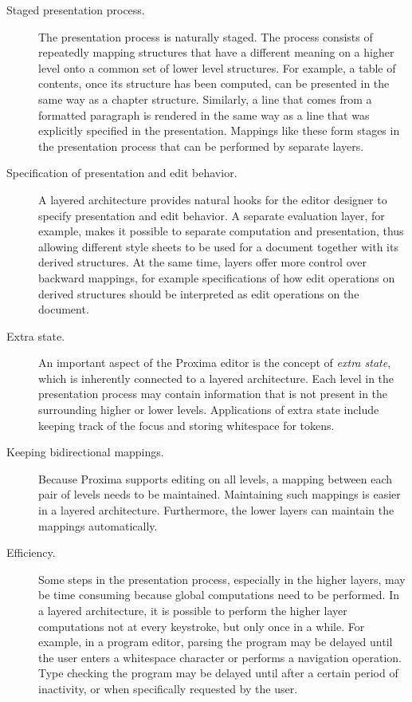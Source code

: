 \begin{description}

\item[Staged presentation process.]
The presentation process is naturally staged. The process consists of repeatedly mapping  structures that have a different meaning on a higher level onto a common set of lower level structures. For example, a table of contents, once its structure has been computed, can be presented in the same way as a chapter structure. Similarly, a line that comes from a formatted paragraph is rendered in the same way as a line that was explicitly specified in the presentation. Mappings like these form stages in the presentation process that can be performed by separate layers.

\item[Specification of presentation and edit behavior.]
A layered architecture provides natural hooks for the editor designer to specify presentation and edit behavior. A separate evaluation layer, for example, makes it possible to separate computation and presentation, thus allowing different style sheets to be used for a document together with its derived structures. At the same time, layers offer more control over backward mappings, for example specifications of how edit operations on derived structures should be interpreted as edit operations on the document.

\item[Extra state.]
An important aspect of the Proxima editor is the concept of {\em extra state}, which is inherently connected to a layered architecture. Each level in the presentation process may contain information that is not present in the surrounding higher or lower levels. Applications of extra state include keeping track of the focus and storing whitespace for tokens. 

\item[Keeping bidirectional mappings.]
Because Proxima supports editing on all levels, a mapping between each pair of levels needs to be maintained. Maintaining such mappings is easier in a layered architecture. Furthermore, the lower layers can maintain the mappings automatically.

\item[Efficiency.]
Some steps in the presentation process, especially in the higher layers, may be time consuming because global computations need to be performed. In a layered architecture, it is possible to perform the higher layer computations not at every keystroke, but only once in a while. For example, in a program editor, parsing the program may be delayed until the user enters a whitespace character or performs a navigation operation. Type checking the program may be delayed until after a certain period of inactivity, or when specifically requested by the user.
\end{description}

